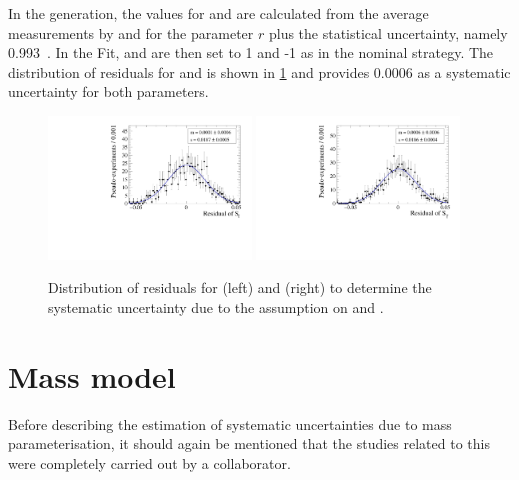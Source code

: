 In the generation, the values for \Cf and \Cfbar are calculated from the average measurements by \belle and \babar for the parameter $r$ plus the statistical uncertainty, namely 0.993~\cite{Aubert:2008zi, Das:2010be}.
In the Fit, \Cf and \Cfbar are then set to \num{1} and {-1} as in the nominal strategy.
The distribution of residuals for \Sf and \Sfbar is shown in \cref{fig:systUncertC} and provides \num{0.0006} as a systematic uncertainty for both parameters.
\begin{figure}[tbp]
    \centering
    \includegraphics[width=0.48\textwidth]{10Systematics/figs/C_Sf_res.pdf}
    \includegraphics[width=0.48\textwidth]{10Systematics/figs/C_Sfbar_res.pdf}
    \caption{Distribution of residuals for \Sf (left) and \Sfbar (right) to determine the systematic uncertainty due to the assumption on \Cf and \Cfbar.}
    \label{fig:systUncertC}
\end{figure}

\section{Mass model}
\label{sec:SystUncertMass}

Before describing the estimation of systematic uncertainties due to mass parameterisation, it should again be mentioned that the studies related to this were completely carried out by a collaborator.

